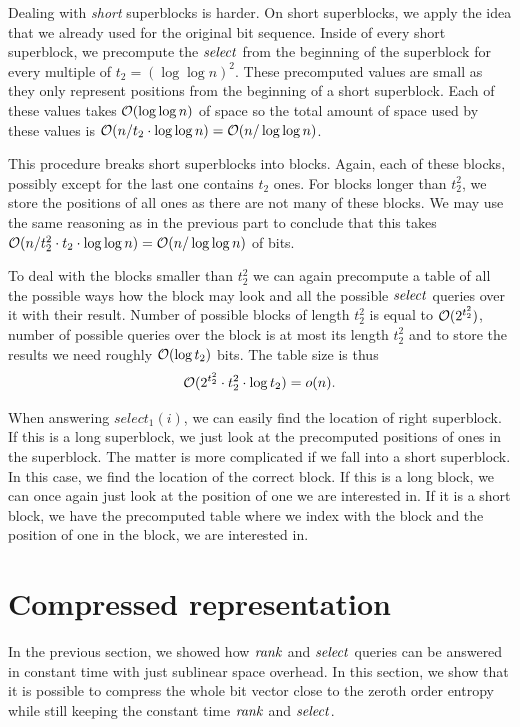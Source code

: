 Dealing with \textit{short} superblocks is harder. On short superblocks, we apply the idea that we
already used for the original bit sequence. Inside of every short superblock, we precompute the
$\mathit{select}$ from the beginning of the superblock for every multiple of $t_2=(\log\log n)^2$. These
precomputed values are small as they only represent positions from the beginning of a short superblock.
Each of these values takes $\mathcal{O}(\log\log n)$ of space so the total amount of space used by these
values is $\mathcal{O}(n/t_2\cdot \log\log n) = \mathcal{O}(n/\log\log n)$.

This procedure breaks short superblocks into blocks. Again, each of these blocks, possibly except for the
last one contains $t_2$ ones. For blocks longer than $t_2^2$, we store the positions of all
ones as there are not many of these blocks. We may use the same reasoning as in the previous
part to conclude that this takes $\mathcal{O}(n/t_2^2\cdot t_2\cdot \log\log n) = \mathcal{O}(n/\log\log n)$
of bits.

To deal with the blocks smaller than $t_2^2$ we can again precompute a table of all
the possible ways how the block may look and all the possible $\mathit{select}$ queries over it with
their result. Number of possible blocks of length $t_2^2$ is equal to $\mathcal{O}(2^{t_2^2})$,
number of possible queries over the block is at most its length $t_2^2$ and to store the results
we need roughly $\mathcal{O}(\log t_2)$ bits. The table size is thus
$$\mathcal{O}(2^{t_2^2}\cdot t_2^2 \cdot \log t_2) = o(n).$$

When answering $select_1(i)$, we can easily find the location of right superblock. If this
is a long superblock, we just look at the precomputed positions of ones in the superblock.
The matter is more complicated if we fall into a short superblock. In this case, we find
the location of the correct block. If this is a long block, we can once again just look
at the position of one we are interested in. If it is a short block, we have the precomputed
table where we index with the block and the position of one in the block, we are interested in.

\section{Compressed representation}
\label{section:compressed_bv}

In the previous section, we showed how $\mathit{rank}$ and $\mathit{select}$ queries can be answered in constant
time with just sublinear space overhead. In this section, we show that it is possible to compress
the whole bit vector close to the zeroth order entropy while still keeping the constant time $\mathit{rank}$
and $\mathit{select}$.


